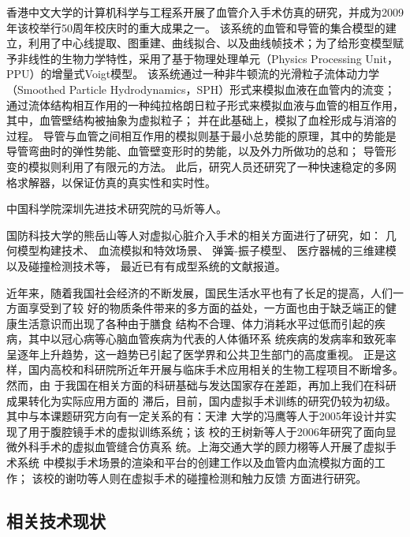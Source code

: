 香港中文大学的计算机科学与工程系开展了血管介入手术仿真的研究\cite{guo2007CUHK}\cite{Chui2010CUHK}\cite{Li2011CUHK}\cite{Li2012CUHK}，并成为2009年该校举行50周年校庆时的重大成果之一\cite{cuhkweb}。
该系统的血管和导管的集合模型的建立，利用了中心线提取、图重建、曲线拟合、以及曲线帧技术；为了给形变模型赋予非线性的生物力学特性，采用了基于物理处理单元（Physics Processing Unit，PPU）的增量式Voigt模型\cite{guo2007CUHK}。
该系统通过一种非牛顿流的光滑粒子流体动力学（Smoothed Particle Hydrodynamics，SPH）形式来模拟血液在血管内的流变；
通过流体结构相互作用的一种纯拉格朗日粒子形式来模拟血液与血管的相互作用，其中，血管壁结构被抽象为虚拟粒子；
并在此基础上，模拟了血栓形成与消溶的过程\cite{Chui2010CUHK}。
导管与血管之间相互作用的模拟则基于最小总势能的原理，其中的势能是导管弯曲时的弹性势能、血管壁变形时的势能，以及外力所做功的总和；
导管形变的模拟则利用了有限元的方法\cite{Li2011CUHK}。
此后，研究人员还研究了一种快速稳定的多网格求解器，以保证仿真的真实性和实时性\cite{Li2012CUHK}。

中国科学院深圳先进技术研究院的马炘等人\cite{Wu2011}\cite{Ma2010SIAT}。

国防科技大学的熊岳山等人对虚拟心脏介入手术的相关方面进行了研究，如：
几何模型构建技术\cite{han2005master}、
血流模拟和特效场景\cite{ren2005master}、
弹簧-振子模型\cite{wang2006master}、
医疗器械的三维建模\cite{zhu2007master}
以及碰撞检测技术\cite{kang2007master}等，
最近已有有成型系统的文献报道\cite{Tan2012NUDT}。

近年来，随着我国社会经济的不断发展，国民生活水平也有了长足的提高，人们一方面享受到了较
好的物质条件带来的多方面的益处，一方面也由于缺乏端正的健康生活意识而出现了各种由于膳食
结构不合理、体力消耗水平过低而引起的疾病，其中以冠心病等心脑血管疾病为代表的人体循环系
统疾病的发病率和致死率呈逐年上升趋势，这一趋势已引起了医学界和公共卫生部门的高度重视。
正是这样，国内高校和科研院所近年开展与临床手术应用相关的生物工程项目不断增多。然而，由
于我国在相关方面的科研基础与发达国家存在差距，再加上我们在科研成果转化为实际应用方面的
滞后，目前，国内虚拟手术训练的研究仍较为初级。其中与本课题研究方向有一定关系的有：天津
大学的冯鹰\cite{li2005master}等人于2005年设计并实现了用于腹腔镜手术的虚拟训练系统；该
校的王树新等人\cite{zeng2006master}于2006年研究了面向显微外科手术的虚拟血管缝合仿真系
统。上海交通大学的顾力栩等人开展了虚拟手术系统
中模拟手术场景的渲染和平台的创建工作\cite{zheng2008master}以及血管内血流模拟方面的工作\cite{huang2011virtual}；
该校的谢叻等人则在虚拟手术的碰撞检测\cite{wu2010virtual}和触力反馈\cite{wu2011virtual}
方面进行研究。

\subsection{相关技术现状}

